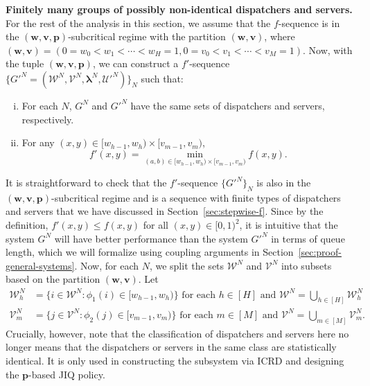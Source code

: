 \documentclass[11pt, reqno]{article}
\numberwithin{equation}{section}
\numberwithin{theorem}{section}
\begin{document}
\noindent
\textbf{Finitely many groups of possibly non-identical dispatchers and servers.}
For the rest of the analysis in this section, we assume that the $f$-sequence is in the $(\mathbf{w},\mathbf{v},\mathbf{p})$-subcritical regime with the partition $(\mathbf{w},\mathbf{v})$, where $(\mathbf{w},\mathbf{v})=(0=w_0<w_1<\cdots<w_H=1,0=v_0<v_1<\cdots<v_M=1)$. 
Now, with the tuple $(\mathbf{w},\mathbf{v},\mathbf{p})$, we can construct a $f'$-sequence $\big\{G'^N=(\mathcal{W}^N,\mathcal{V}^N,\boldsymbol\lambda^N,\mathcal{U}'^N)\big\}_N$ such that:
\begin{enumerate}[(i)]
    \item For each $N$, $G^N$ and $G'^N$ have the same sets of dispatchers and servers, respectively. 
    \item For any $(x,y)\in[w_{h-1},w_{h})\times[v_{m-1},v_m)$, 
    \begin{equation}\label{eq:f'}
        f'(x,y)=\min_{(a,b)\in[w_{h-1},w_{h})\times[v_{m-1},v_m)}f(x,y).
    \end{equation}
\end{enumerate}
It is straightforward to check that the $f'$-sequence $\{G'^N\}_N$ is also in the $(\mathbf{w},\mathbf{v},\mathbf{p})$-subcritical regime and is a sequence with finite types of dispatchers and servers that we have discussed in Section~\ref{sec:stepwise-f}. 
Since by the definition, $f'(x,y)\leq f(x,y)$ for all $(x,y)\in[0,1)^2$, it is intuitive that the system $G^N$ will have better performance than the system $G'^N$ in terms of queue length, which we will formalize using coupling arguments in Section~\ref{sec:proof-general-systems}.
Now, for each $N$, we split the sets $\mathcal{W}^N$ and $\mathcal{V}^N$ into subsets based on the partition $(\mathbf{w},\mathbf{v})$. Let
\begin{align*}
    \mathcal{W}^N_h&=\Big\{i\in\mathcal{W}^N:\phi_1(i)\in[w_{h-1},w_h)\Big\}\text{ for each }h\in[H] \text { and  }\mathcal{W}^N=\bigcup_{h\in[H]}\mathcal{W}^N_h\\
    \mathcal{V}^N_m&=\Big\{j\in\mathcal{V}^N:\phi_2(j)\in[v_{m-1},v_m)\Big\}\text{ for each }m\in[M] \text { and  }\mathcal{V}^N=\bigcup_{m\in[M]}\mathcal{V}^N_m.
\end{align*}
Crucially, however, note that the classification of dispatchers and servers here no longer means that the dispatchers or servers in the same class are statistically identical. 
It is only used in constructing the subsystem via ICRD and designing the $\mathbf{p}$-based JIQ policy.\\
\end{document}
